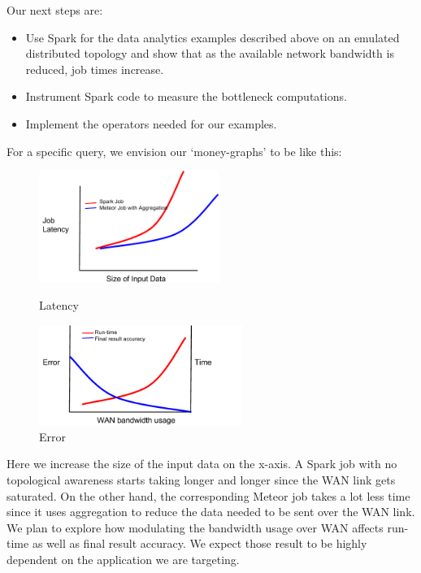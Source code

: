 Our next steps are:
\begin{itemize}
\item Use Spark for the data analytics examples described above on an emulated distributed topology and show that as the available network bandwidth is reduced, job times increase.
\item Instrument Spark code to measure the bottleneck computations.
\item Implement the operators needed for our examples.
\end{itemize}

For a specific query, we envision our ‘money-graphs’ to be like this:

\begin{figure}[ht]
	\centering
	\begin{minipage}[b]{0.45\linewidth}
		\includegraphics[width=2.3in]{figs/fig_1.png}
		\caption{Latency}
		\label{fig:minipage1}
	\end{minipage}
	\quad
	\begin{minipage}[b]{0.45\linewidth}
		\includegraphics[width=2.6in]{figs/fig_2.png}
		\caption{Error}
		\label{fig:minipage2}
	\end{minipage}
\end{figure}

Here we increase the size of the input data on the x-axis. A Spark job with no topological awareness starts taking longer and longer since the WAN link gets saturated. On the other hand, the corresponding Meteor job takes a lot less time since it uses aggregation to reduce the data needed to be sent over the WAN link. We plan to explore how modulating the bandwidth usage over WAN affects run-time as well as final result accuracy. We expect those result to be highly dependent on the application we are targeting.
